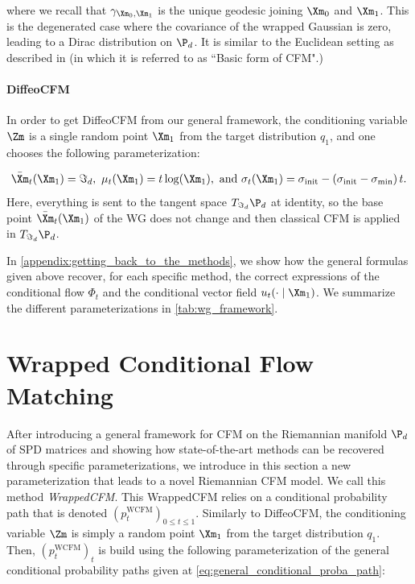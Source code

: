 \documentclass[10pt]{article} %
\theoremstyle{plain}
\theoremstyle{definition}
\theoremstyle{remark}
\begin{document}
where we recall that $\gamma_{\Xm_0, \Xm_1}$ is the unique geodesic joining $\Xm_0$ and $\Xm_1$. This is the degenerated case where the covariance of the wrapped Gaussian is zero, leading to a Dirac distribution on $\P_d$. It is similar to the Euclidean setting as described in \citet{tong2024improving} (in which it is referred to as ``Basic form of CFM".)
\paragraph{DiffeoCFM} In order to get DiffeoCFM from our general framework, the conditioning variable $\Zm$ is a single random point $\Xm_1$ from the target distribution $q_1$, and one chooses the following parameterization:

\[
  \bar{\Xm}_t(\Xm_1) = \Im_d,~
  \mu_t(\Xm_1) = t\log(\Xm_1), \text{ and }
  \sigma_t(\Xm_1) = \sigma_{\text{init}} - \left(\sigma_{\text{init}} - \sigma_{\min}\right)t.
\]
Here, everything is sent to the tangent space $T_{\Im_d} \P_d$ at identity, so the base point $\bar{\Xm}_t(\Xm_1)$ of the WG does not change and then classical CFM is applied in $T_{\Im_d} \P_d$.

In \cref{appendix:getting_back_to_the_methods}, we show how the general formulas given above recover, for each specific method, the correct expressions of the conditional flow $\Phi_t$ and the conditional vector field $u_t(\cdot \mid \Xm_1)$. We summarize the different parameterizations in \cref{tab:wg_framework}.

\section{Wrapped Conditional Flow Matching}
\label{sec:W-CFM}
After introducing a general framework for CFM on the Riemannian manifold $\P_d$ of SPD matrices and showing how state-of-the-art methods can be recovered through specific parameterizations, we introduce in this section a new parameterization that leads to a novel Riemannian CFM model. We call this method \emph{WrappedCFM}. This WrappedCFM relies on a conditional probability path that is denoted $(p^{\text{WCFM}}_t)_{0 \leq t \leq 1}$. Similarly to DiffeoCFM, the conditioning variable $\Zm$ is simply a random point $\Xm_1$ from the target distribution $q_1$. Then,  $(p^{\text{WCFM}}_t)_{t}$ is build using the following parameterization of the general conditional probability paths given at \cref{eq:general_conditional_proba_path}:
\end{document}
